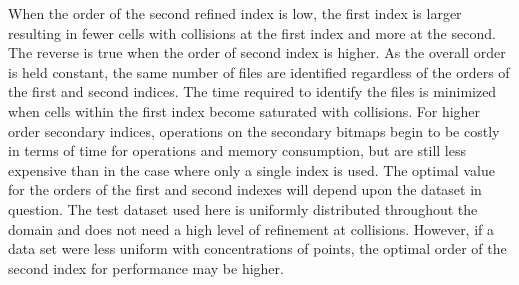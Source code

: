\documentclass[apjl]{emulateapj}
\begin{document}
When the order of the second refined index is low, the first index is larger resulting in fewer cells with collisions at the first index and more at the second. The reverse is true when the order of second index is higher. As the overall order is held constant, the same number of files are identified regardless of the orders of the first and second indices. The time required to identify the files is minimized when cells within the first index become saturated with collisions. For higher order secondary indices, operations on the secondary bitmaps begin to be costly in terms of time for operations and memory consumption, but are still less expensive than in the case where only a single index is used. The optimal value for the orders of the first and second indexes will depend upon the dataset in question. The test dataset used here is uniformly distributed throughout the domain and does not need a high level of refinement at collisions. However, if a data set were less uniform with concentrations of points, the optimal order of the second index for performance may be higher.

\end{document}
